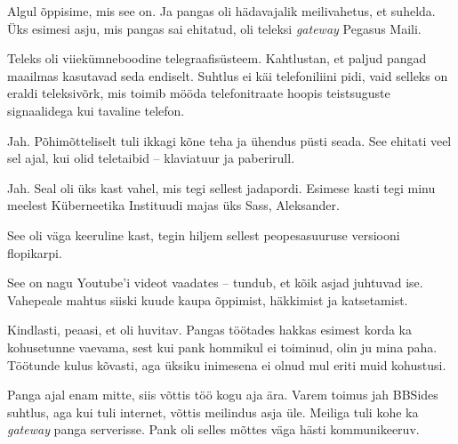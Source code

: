 
Algul õppisime, mis see on. Ja pangas oli hädavajalik meilivahetus, et suhelda. Üks esimesi asju, mis pangas sai 
ehitatud, oli teleksi \emph{gateway} Pegasus Maili. 


Teleks oli viiekümneboodine telegraafisüsteem. Kahtlustan, et paljud pangad maailmas kasutavad seda endiselt. Suhtlus ei käi telefoniliini 
pidi, vaid selleks on eraldi teleksivõrk, mis toimib mööda telefonitraate 
hoopis teistsuguste signaalidega kui tavaline telefon.


Jah. Põhimõtteliselt tuli ikkagi kõne teha ja ühendus püsti seada. 
See ehitati veel sel ajal, kui olid teletaibid -- klaviatuur ja 
paberirull.


Jah. Seal oli üks kast vahel, mis tegi sellest jadapordi. Esimese kasti tegi minu meelest
Küberneetika Instituudi majas üks Sass, Aleksander.

See oli väga keeruline kast, tegin hiljem sellest peopesasuuruse 
versiooni flopikarpi.


See on nagu Youtube'i videot vaadates -- tundub, et kõik asjad juhtuvad ise. 
Vahepeale mahtus siiski kuude kaupa õppimist, häkkimist ja katsetamist.


Kindlasti, peaasi, et oli huvitav. 
Pangas töötades hakkas esimest korda ka kohusetunne vaevama, sest kui pank hommikul ei toiminud, olin ju mina paha.
Töötunde kulus kõvasti, aga üksiku inimesena ei olnud mul eriti muid kohustusi.


Panga ajal enam mitte, siis võttis töö kogu aja ära. Varem toimus jah BBSides suhtlus, aga kui tuli internet, võttis meilindus asja üle. Meiliga tuli kohe ka  \emph{gateway} 
 panga serverisse. Pank oli selles mõttes väga hästi kommunikeeruv.

